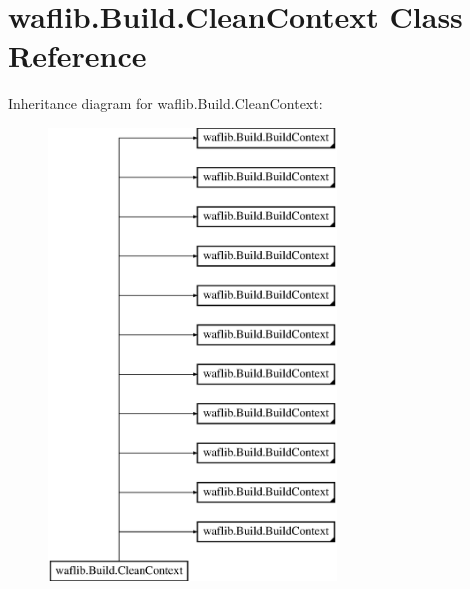 \hypertarget{classwaflib_1_1_build_1_1_clean_context}{}\section{waflib.\+Build.\+Clean\+Context Class Reference}
\label{classwaflib_1_1_build_1_1_clean_context}
Inheritance diagram for waflib.\+Build.\+Clean\+Context\+:\begin{figure}[H]
\begin{center}
\leavevmode
\includegraphics[height=12.000000cm]{classwaflib_1_1_build_1_1_clean_context}
\end{center}
\end{figure}
